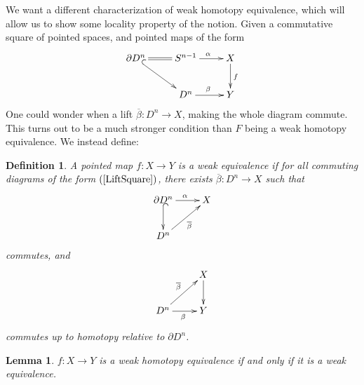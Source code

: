 \documentclass{article}
\newtheorem{lemma}[theorem]{Lemma}
\newtheorem{definition}[theorem]{Definition}
\newtheorem{proposed work}[theorem]{Proposed Work}
\newcommand{\xymat}[1]{\begin{align*}\xymatrix{ #1}\end{align*}}
\newcommand{\xymattal}[2]{\begin{align} \label{#1} \xymatrix{ #2}\end{align}}
\begin{document}
We want a different characterization of weak homotopy equivalence, which will allow us to show some locality property of the notion. Given a commutative square of pointed spaces, and pointed maps of the form  
\xymattal{LiftSquare}{\partial D^n \ar@{=}[r] \ar@{^{(}->}[dr]&S^{n-1} \ar[r]^\alpha  & X \ar[d]^f \\& D^n \ar[r]^\beta & Y}
One could wonder when a lift $\overline{\beta}: D^n \to X$, making the whole diagram commute. This turns out to be a much stronger condition than $F$ being a weak homotopy equivalence. We instead define:
\begin{definition}
A pointed map $f:X\to Y$ is a weak equivalence if for all commuting diagrams of the form $(\ref{LiftSquare})$, there exists $\overline{\beta}:D^n\to X$ such that
\xymat{\partial D^n \ar[r]^\alpha \ar@{^{(}->}[d]& X \\ D^n \ar[ur]_{\overline{\beta}} &} commutes, and 
\xymat{& X \ar[d] \\ D^n \ar[ur]^{\overline{\beta}} \ar[r]_\beta & Y}
commutes up to homotopy relative to $\partial D^n$.
\end{definition}
\begin{lemma}
$f:X\to Y$ is a weak homotopy equivalence if and only if it is a weak equivalence.
\end{lemma}
\end{document}
